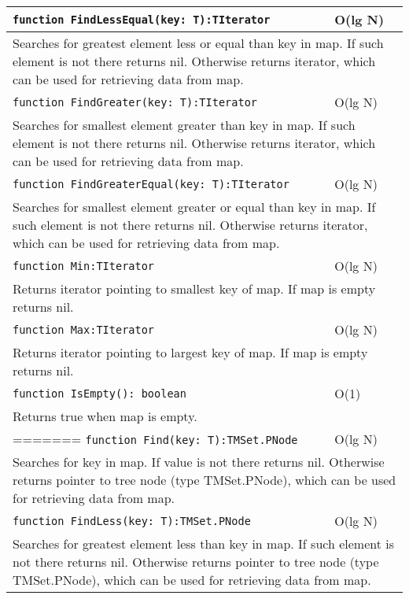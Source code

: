 \begin{longtable}{|m{10cm}|m{5cm}|}
\verb!function FindLessEqual(key: T):TIterator! & O(lg N) \\\hline
\multicolumn{2}{|m{15cm}|}{Searches for greatest element less or equal than key in map. If such element is not there returns nil. Otherwise
returns iterator, which can be used for retrieving data from map.} \\\hline\hline

\verb!function FindGreater(key: T):TIterator! & O(lg N) \\\hline
\multicolumn{2}{|m{15cm}|}{Searches for smallest element greater than key in map. If such element is not there returns nil. Otherwise
returns iterator, which can be used for retrieving data from map.} \\\hline\hline

\verb!function FindGreaterEqual(key: T):TIterator! & O(lg N) \\\hline
\multicolumn{2}{|m{15cm}|}{Searches for smallest element greater or equal than key in map. If such element is not there returns nil. Otherwise
returns iterator, which can be used for retrieving data from map.} \\\hline\hline

\verb!function Min:TIterator! & O(lg N) \\\hline
\multicolumn{2}{|m{15cm}|}{Returns iterator pointing to smallest key of map. If map is empty returns
nil.} \\\hline\hline

\verb!function Max:TIterator! & O(lg N) \\\hline
\multicolumn{2}{|m{15cm}|}{Returns iterator pointing to largest key of map. If map is empty returns
nil.} \\\hline\hline

\verb!function IsEmpty(): boolean! & O(1) \\ \hline
\multicolumn{2}{|m{15cm}|}{Returns true when map is empty.} \\\hline

=======
\verb!function Find(key: T):TMSet.PNode! & O(lg N) \\\hline
\multicolumn{2}{|m{15cm}|}{Searches for key in map. If value is not there returns nil. Otherwise
returns pointer to tree node (type TMSet.PNode), which can be used for retrieving data from map.} \\\hline\hline

\verb!function FindLess(key: T):TMSet.PNode! & O(lg N) \\\hline
\multicolumn{2}{|m{15cm}|}{Searches for greatest element less than key in map. If such element is not there returns nil. Otherwise
returns pointer to tree node (type TMSet.PNode), which can be used for retrieving data from map.} \\\hline\hline


\end{longtable}
